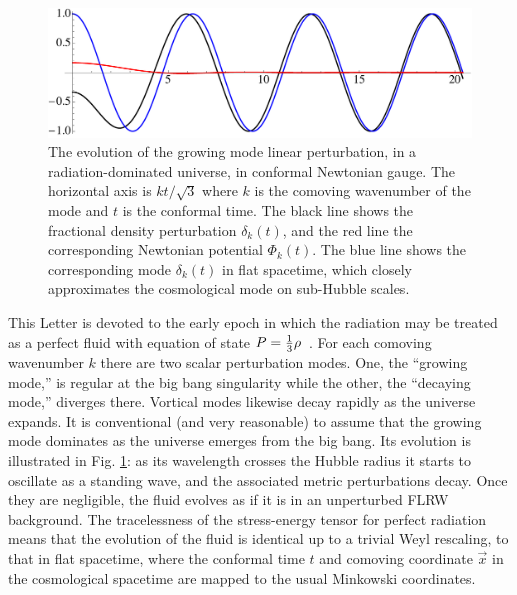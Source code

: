 \documentclass[prl,aps,10pt,twocolumn,showkeys,nofootinbib]{revtex4-1}
\begin{document}
\begin{figure}[htp]
\includegraphics[scale=0.35]{modesfig.pdf}
\caption{The evolution of the growing mode linear perturbation, in a radiation-dominated universe, in conformal Newtonian gauge. The horizontal axis is $kt/\sqrt{3}$ where $k$ is the comoving wavenumber of the mode and $t$ is the conformal time. The black line shows the fractional density perturbation $\delta_k(t)$, and the red line the corresponding Newtonian potential $\Phi_k(t)$. The blue line shows the corresponding mode $\delta_k(t)$ in flat spacetime, which closely approximates the cosmological mode on sub-Hubble scales.}
\label{modesfig}
\end{figure}

This Letter is devoted to the early epoch in which the radiation may be treated as a perfect fluid with equation of state $P={1\over 3} \rho$~\cite{foot1}. For each comoving wavenumber $k$ there are two scalar perturbation modes. One, the ``growing mode,'' is regular at the big bang singularity while the other, the ``decaying mode,'' diverges there. Vortical modes likewise decay rapidly as the universe expands. It is conventional (and very reasonable) to assume that the growing mode dominates as the universe emerges from the big bang. Its evolution is illustrated in Fig. \ref{modesfig}: as its wavelength crosses the Hubble radius it starts to oscillate as a standing wave, and the associated metric perturbations decay. Once they are negligible, the fluid evolves as if it is in an unperturbed FLRW background. The tracelessness of the stress-energy tensor for perfect radiation means that the evolution of the fluid is identical up to a trivial Weyl rescaling, to that in flat spacetime, where the conformal time $t$ and comoving coordinate $\vec{x}$ in the cosmological spacetime are mapped to the usual Minkowski coordinates. 
\end{document}
